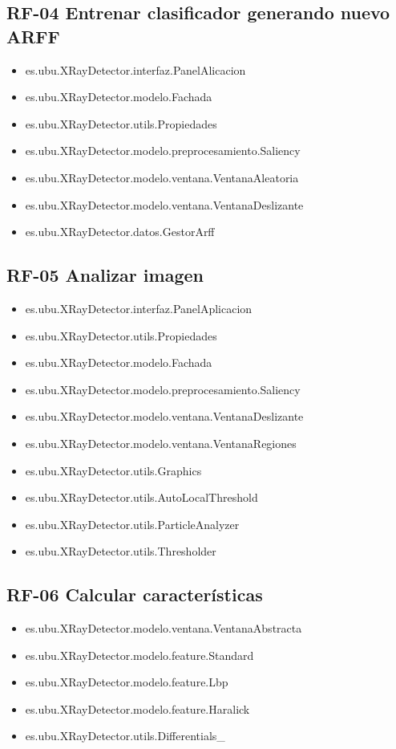 \subsection{RF-04 Entrenar clasificador generando nuevo ARFF}
\begin{itemize}
\item[] es.ubu.XRayDetector.interfaz.PanelAlicacion
\item[] es.ubu.XRayDetector.modelo.Fachada
\item[] es.ubu.XRayDetector.utils.Propiedades
\item[] es.ubu.XRayDetector.modelo.preprocesamiento.Saliency
\item[] es.ubu.XRayDetector.modelo.ventana.VentanaAleatoria
\item[] es.ubu.XRayDetector.modelo.ventana.VentanaDeslizante
\item[] es.ubu.XRayDetector.datos.GestorArff
\end{itemize}

\subsection{RF-05 Analizar imagen}
\begin{itemize}
\item[] es.ubu.XRayDetector.interfaz.PanelAplicacion
\item[] es.ubu.XRayDetector.utils.Propiedades
\item[] es.ubu.XRayDetector.modelo.Fachada
\item[] es.ubu.XRayDetector.modelo.preprocesamiento.Saliency
\item[] es.ubu.XRayDetector.modelo.ventana.VentanaDeslizante
\item[] es.ubu.XRayDetector.modelo.ventana.VentanaRegiones
\item[] es.ubu.XRayDetector.utils.Graphics
\item[] es.ubu.XRayDetector.utils.AutoLocalThreshold
\item[] es.ubu.XRayDetector.utils.ParticleAnalyzer
\item[] es.ubu.XRayDetector.utils.Thresholder
\end{itemize}

\subsection{RF-06 Calcular características}
\begin{itemize}
\item[] es.ubu.XRayDetector.modelo.ventana.VentanaAbstracta
\item[] es.ubu.XRayDetector.modelo.feature.Standard
\item[] es.ubu.XRayDetector.modelo.feature.Lbp
\item[] es.ubu.XRayDetector.modelo.feature.Haralick
\item[] es.ubu.XRayDetector.utils.Differentials\_
\end{itemize}

